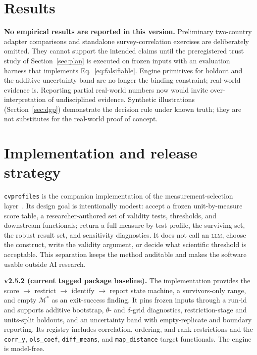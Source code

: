 \documentclass[10pt,letterpaper]{article}
\newcommand{\LLM}{\textsc{llm}}
\newcommand{\cvp}{\texttt{cvprofiles}}
\newcommand{\M}{\ensuremath{\mathcal{M}}}
\begin{document}
\section{Results}
\label{sec:results}
\noindent\colorbox{mist}{\parbox{0.965\textwidth}{\small\vspace{0.35em}
\textbf{No empirical results are reported in this version.}
Preliminary two-country adapter comparisons and standalone survey-correlation exercises are deliberately omitted.
They cannot support the intended claims until the preregistered trust study of Section~\ref{sec:plan} is executed on frozen inputs with an evaluation harness that implements Eq.~\eqref{eq:falsifiable}.
Engine primitives for holdout and the additive uncertainty band are no longer the binding constraint; real-world evidence is.
Reporting partial real-world numbers now would invite over-interpretation of undisciplined evidence.
Synthetic illustrations (Section~\ref{sec:dgp}) demonstrate the decision rule under known truth; they are not substitutes for the real-world proof of concept.
\vspace{0.35em}}}

\section{Implementation and release strategy}
\label{sec:impl}
\cvp{} is the companion implementation of the measurement-selection layer~\cite{cvprofiles}.
Its design goal is intentionally modest: accept a frozen unit-by-measure score table, a researcher-authored set of validity tests, thresholds, and downstream functionals; return a full measure-by-test profile, the surviving set, the robust result set, and sensitivity diagnostics.
It does not call an \LLM{}, choose the construct, write the validity argument, or decide what scientific threshold is acceptable.
This separation keeps the method auditable and makes the software usable outside AI research.

\textbf{v2.5.2 (current tagged package baseline).}
 The implementation provides the score $\to$ restrict $\to$ identify $\to$ report state machine, a survivors-only range, and empty $\M^*$ as an exit-success finding. It pins frozen inputs through a run-id and supports additive bootstrap, $\theta$- and $\delta$-grid diagnostics, restriction-stage and units-split holdouts, and an uncertainty band with empty-replicate and boundary reporting. Its registry includes correlation, ordering, and rank restrictions and the \texttt{corr\_y}, \texttt{ols\_coef}, \texttt{diff\_means}, and \texttt{map\_distance} target functionals. The engine is model-free.
\end{document}
